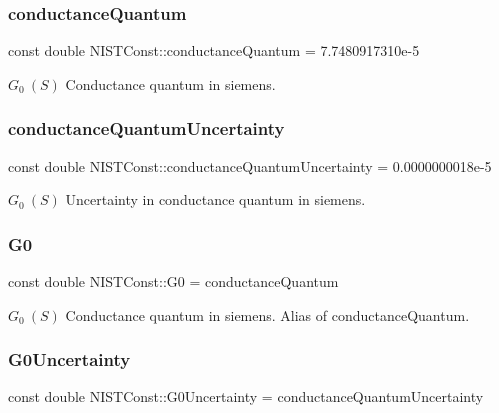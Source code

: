 \subsubsection{\texorpdfstring{conductance\+Quantum}{conductanceQuantum}}
{\footnotesize\ttfamily const double N\+I\+S\+T\+Const\+::conductance\+Quantum = 7.\+7480917310e-\/5}

$G_0 \ (S)$ Conductance quantum in siemens. \mbox{\label{group___n_i_s_t_const-_conductance_quantum_ga599b808b8a742da1bb97cdb68f65cbf9}} 
\subsubsection{\texorpdfstring{conductance\+Quantum\+Uncertainty}{conductanceQuantumUncertainty}}
{\footnotesize\ttfamily const double N\+I\+S\+T\+Const\+::conductance\+Quantum\+Uncertainty = 0.\+0000000018e-\/5}

$G_0 \ (S)$ Uncertainty in conductance quantum in siemens. \mbox{\label{group___n_i_s_t_const-_conductance_quantum_ga04bee7105fe6a217430a2db2913e7754}} 
\subsubsection{\texorpdfstring{G0}{G0}}
{\footnotesize\ttfamily const double N\+I\+S\+T\+Const\+::\+G0 = conductance\+Quantum}

$G_0 \ (S)$ Conductance quantum in siemens. Alias of conductance\+Quantum. \mbox{\label{group___n_i_s_t_const-_conductance_quantum_gab513ebf6083eb652771a17515e895301}} 
\subsubsection{\texorpdfstring{G0\+Uncertainty}{G0Uncertainty}}
{\footnotesize\ttfamily const double N\+I\+S\+T\+Const\+::\+G0\+Uncertainty = conductance\+Quantum\+Uncertainty}

